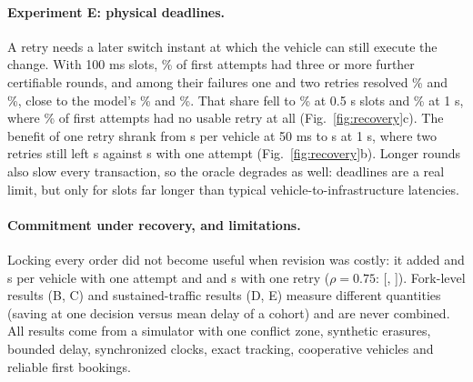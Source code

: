 \documentclass[10pt]{article}
\begin{document}
\begin{table}[t]\centering\small
\caption{\textbf{Sustained traffic at 10\% loss per leg, 100 ms slots} (60 streams per cell). Mean cohort delay and extra delay against instantaneous rolling (s per vehicle); pinned vehicles and retransmissions plus queries (retx) per stream.}\label{tab:recovery}

\end{table}

\paragraph{Experiment E: physical deadlines.} A retry needs a later switch instant at which the vehicle can still execute the change. With 100 ms slots, \nRtSpareThreeTenth\% of first attempts had three or more further certifiable rounds, and among their failures one and two retries resolved \nRtRecAmpleOne\% and \nRtRecAmpleTwo\%, close to the model's \nRtModelRecOne\% and \nRtModelRecTwo\%. That share fell to \nRtSpareThreeHalf\% at 0.5 s slots and \nRtSpareThreeSecond\% at 1 s, where \nRtSpareZeroSecond\% of first attempts had no usable retry at all (Fig.~\ref{fig:recovery}c). The benefit of one retry shrank from \nRtSlotFiftyOneHighAbs{} s per vehicle at 50 ms to \nRtSlotSecondOneHighAbs{} s at 1 s, where two retries still left \nRtSlotSecondPriceTwoHigh{} s against \nRtSlotSecondPriceZeroHigh{} s with one attempt (Fig.~\ref{fig:recovery}b). Longer rounds also slow every transaction, so the oracle degrades as well: deadlines are a real limit, but only for slots far longer than typical vehicle-to-infrastructure latencies.

\paragraph{Commitment under recovery, and limitations.} Locking every order did not become useful when revision was costly: it added \nRtFreezeZeroLowAbs{} and \nRtFreezeZeroHighAbs{} s per vehicle with one attempt and \nRtFreezeOneLowAbs{} and \nRtFreezeOneHighAbs{} s with one retry ($\rho=0.75$: [\nRtFreezeOneHighLo, \nRtFreezeOneHighHi]). Fork-level results (B, C) and sustained-traffic results (D, E) measure different quantities (saving at one decision versus mean delay of a cohort) and are never combined. All results come from a simulator with one conflict zone, synthetic erasures, bounded delay, synchronized clocks, exact tracking, cooperative vehicles and reliable first bookings.
\end{document}
